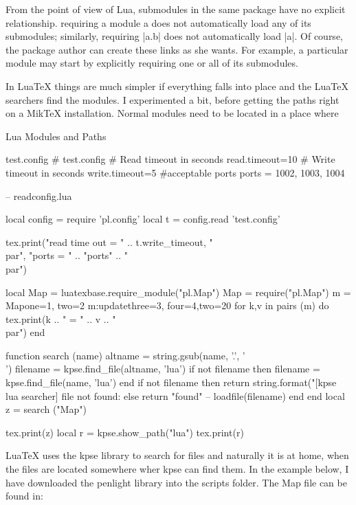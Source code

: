 From the point of view of Lua, submodules in the same package have no explicit relationship. requiring a module a does not automatically load any of its submodules; similarly, requiring |a.b| does not automatically load |a|. Of course, the package author can create these links as she wants. For example, a particular module may start by explicitly requiring one or all of its submodules.

In LuaTeX things are much simpler if everything falls into place and the LuaTeX searchers find the modules. I experimented a bit, before getting the paths right on a MikTeX installation. Normal modules need to be located in a place where 

\begin{texexample}{Lua Modules and Paths}{}
\begin{filecontents*}{test.config}
    # test.config
    # Read timeout in seconds
    read.timeout=10
    # Write timeout in seconds
    write.timeout=5
   #acceptable ports
   ports = 1002, 1003, 1004
\end{filecontents*}
\begin{luacode}
  -- readconfig.lua
  
local config       = require 'pl.config'
local t              = config.read 'test.config'

tex.print("read time out = " .. t.write_timeout, "\\par",
            "ports = " .. "ports" .. "\\par")

 local Map = luatexbase.require_module("pl.Map")   
 Map = require("pl.Map")
   m = Map{one=1, two=2}
   m:update{three=3, four=4,two=20}
   for k,v in pairs (m) do
       tex.print(k .. " = " .. v .. "\\par")
   end 
   
 function search (name)
    altname = string.gsub(name, '.', '\\')
    filename = kpse.find_file(altname, 'lua')	
    if not filename then
      filename = kpse.find_file(name, 'lua')
    end
    if not filename then
      return string.format("[kpse lua searcher] file not found: %
    else
      return "found" -- loadfile(filename)
    end
end
local z = search ("Map")

tex.print(z)
local r = kpse.show_path("lua")
tex.print(r)
\end{luacode}
\end{texexample}



LuaTeX uses the kpse library to search for files and naturally it is at home, when the files are located somewhere wher kpse can find them. In the example below, I have downloaded the penlight library into the scripts folder. The Map file can be found in:

